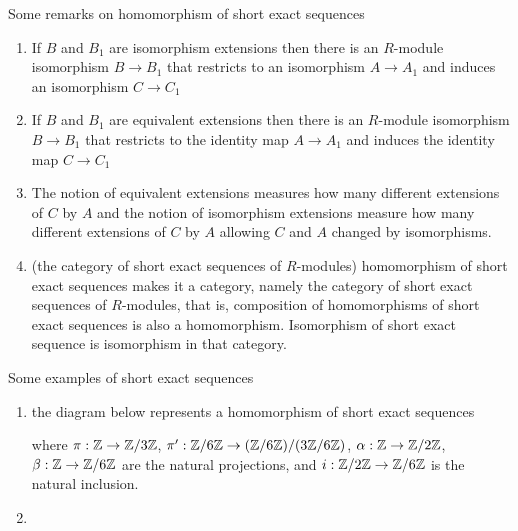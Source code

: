 \begin{remark}
	Some remarks on homomorphism of short exact sequences
	\begin{enumerate}
		\item If $B$ and $B_1$ are isomorphism extensions then there is an $R$-module isomorphism $B \to B_1$ that restricts to an isomorphism $A \to A_1$ and induces an isomorphism $C \to C_1$
		
		\item If $B$ and $B_1$ are equivalent extensions then there is an $R$-module isomorphism $B \to B_1$ that restricts to the identity map $A \to A_1$ and induces the identity map $C \to C_1$
		
		\item The notion of equivalent extensions measures how many different extensions of $C$ by $A$ and the notion of isomorphism extensions measure how many different extensions of $C$ by $A$ allowing $C$ and $A$ changed by isomorphisms.
		
		\item (the category of short exact sequences of $R$-modules) homomorphism of short exact sequences makes it a category, namely the category of short exact sequences of $R$-modules, that is, composition of homomorphisms of short exact sequences is also a homomorphism. Isomorphism of short exact sequence is isomorphism in that category.
		
		\end{enumerate}
\end{remark}


\begin{remark}
	Some examples of short exact sequences
	\begin{enumerate}
		\item the diagram below represents a homomorphism of short exact sequences
		\begin{center}
		\end{center}
		
		where $\pi: \mathbb{Z} \to \mathbb{Z} / 3\mathbb{Z}$, $\pi': \mathbb{Z} / 6\mathbb{Z} \to (\mathbb{Z} / 6\mathbb{Z}) / (3\mathbb{Z} / 6\mathbb{Z})$, $\alpha: \mathbb{Z} \to \mathbb{Z} / 2\mathbb{Z}$, $\beta: \mathbb{Z} \to \mathbb{Z} / 6\mathbb{Z}$ are the natural projections, and $i: \mathbb{Z} / 2\mathbb{Z} \to \mathbb{Z} / 6\mathbb{Z}$ is the natural inclusion.
		
		\item {}
	\end{enumerate}
\end{remark}

